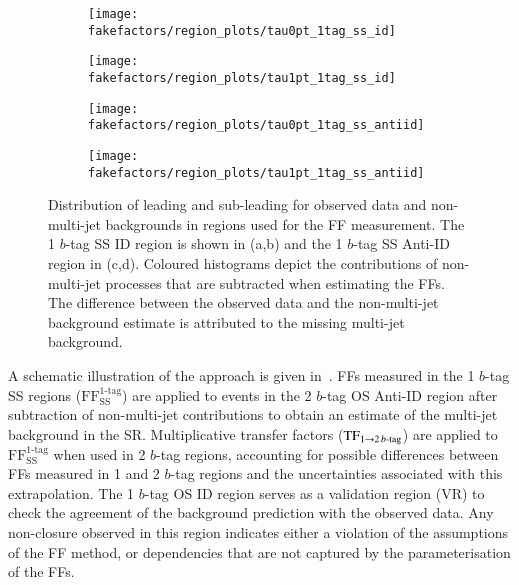 \begin{figure}[htbp]
  \centering

  \begin{subfigure}{0.49\textwidth}
    \texttt{[image: fakefactors/region\_plots/tau0pt\_1tag\_ss\_id]}
  \end{subfigure}
  \begin{subfigure}{0.49\textwidth}
    \texttt{[image: fakefactors/region\_plots/tau1pt\_1tag\_ss\_id]}
  \end{subfigure}

  \begin{subfigure}{0.49\textwidth}
    \texttt{[image: fakefactors/region\_plots/tau0pt\_1tag\_ss\_antiid]}
  \end{subfigure}
  \begin{subfigure}{0.49\textwidth}
    \texttt{[image: fakefactors/region\_plots/tau1pt\_1tag\_ss\_antiid]}
  \end{subfigure}

  \caption{Distribution of leading and sub-leading \tauhadvis \pT for observed
    data and non-multi-jet backgrounds in regions used for the FF
    measurement. The 1 $b$-tag SS ID region is shown in (a,b) and the 1 $b$-tag
    SS Anti-ID region in (c,d). Coloured histograms depict the contributions of
    non-multi-jet processes that are subtracted when estimating the FFs. The
    difference between the observed data and the non-multi-jet background
    estimate is attributed to the missing multi-jet background.}%
  \label{fig:mjfakes_1tag_ss_plots}
\end{figure}

A schematic illustration of the approach is given
in~. FFs measured in the 1 $b$-tag SS regions
($\text{FF}_\text{SS}^\text{1-tag}$) are applied to events in the 2 $b$-tag OS
Anti-ID region after subtraction of non-multi-jet contributions to obtain an
estimate of the multi-jet background in the SR. Multiplicative transfer factors
($\text{TF}_{1 \rightarrow 2\,b\text{-tag}}$) are applied to
$\text{FF}_\text{SS}^\text{1-tag}$ when used in 2 $b$-tag regions, accounting
for possible differences between FFs measured in 1 and 2 $b$-tag regions and the
uncertainties associated with this extrapolation. The 1 $b$-tag OS ID region
serves as a validation region (VR) to check the agreement of the background
prediction with the observed data. Any non-closure observed in this region
indicates either a violation of the assumptions of the FF method, or
dependencies that are not captured by the parameterisation of the FFs.

